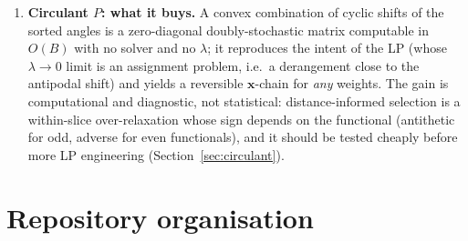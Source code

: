\documentclass[11pt,a4paper]{article}
\theoremstyle{remark}
\newcommand{\bx}{\bm{x}}
\begin{document}
\begin{enumerate}[leftmargin=*]
\item \textbf{Circulant $P$: what it buys.} A convex combination of cyclic shifts of the sorted angles is a zero-diagonal doubly-stochastic matrix computable in $O(B)$ with no solver and no $\lambda$; it reproduces the intent of the LP (whose $\lambda\to0$ limit is an assignment problem, i.e.\ a derangement close to the antipodal shift) and yields a reversible $\bx$-chain for \emph{any} weights. The gain is computational and diagnostic, not statistical: distance-informed selection is a within-slice over-relaxation whose sign depends on the functional (antithetic for odd, adverse for even functionals), and it should be tested cheaply before more LP engineering (Section~\ref{sec:circulant}).
\end{enumerate}

\section{Repository organisation}\label{sec:org}
\end{document}

